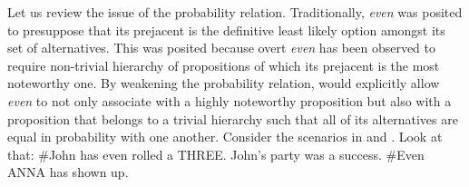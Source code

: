 Let us review the issue of the probability relation. Traditionally, \textit{even} was posited to presuppose that its prejacent is the definitive least likely option amongst its set of alternatives. This was posited because overt \textit{even} has been observed to require non-trivial hierarchy of propositions of which its prejacent is the most noteworthy one. By weakening the probability relation, \textcite{Jeong2021,Jeong2022} would explicitly allow \textit{even} to not only associate with a highly noteworthy proposition but also with a proposition that belongs to a trivial hierarchy such that all of its alternatives are equal in probability with one another. Consider the scenarios in  and .
\ex{}
Look at that: \#John has even rolled a \MakeUppercase{three}.
\xe
\ex{}
John's party was a success. \#Even \MakeUppercase{Anna} has shown up.
\xe
